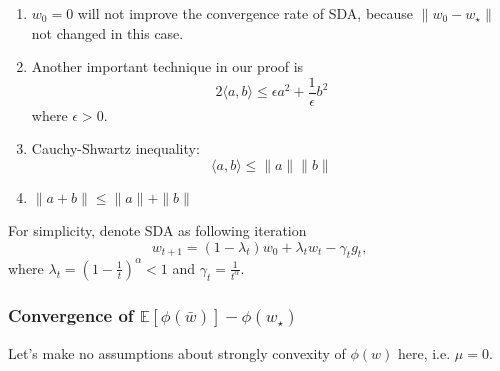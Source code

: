 \begin{enumerate}
	\item $w_0=0$ will not improve the convergence rate of SDA, because $\|w_0-w_\star\|$ not changed in this case.
	
	\item Another important technique in our proof is
	\begin{equation}
		2\langle a, b\rangle \leq \epsilon a^2 +\frac{1}{\epsilon} b^2
	\end{equation}
	where $\epsilon>0$.
	
	\item Cauchy-Shwartz inequality:
	\begin{equation}
		\langle a, b\rangle \leq \|a\| \|b\|
	\end{equation}
	
	\item $\|a+b\| \leq \|a\|+\|b\|$
\end{enumerate}
For simplicity, denote SDA as following iteration
\begin{equation}
	w_{t+1}=(1-\lambda_t)w_0+\lambda_t w_t - \gamma_t g_t,
\end{equation}
where $\lambda_t= \left( 1-\frac{1}{t} \right)^\alpha <1$ and $\gamma_t= \frac{1}{t^\alpha}$.

\subsubsection{Convergence of $\mathbb{E}\left[ \phi(\bar{w}) \right] -\phi(w_\star)$}
Let's make no assumptions about strongly convexity of $\phi(w)$ here, i.e. $\mu=0$.

